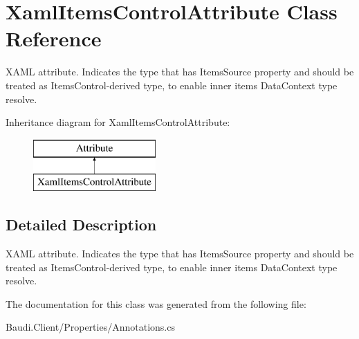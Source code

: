 \hypertarget{class_xaml_items_control_attribute}{}\section{Xaml\+Items\+Control\+Attribute Class Reference}
\label{class_xaml_items_control_attribute}


X\+A\+M\+L attribute. Indicates the type that has {\ttfamily Items\+Source} property and should be treated as {\ttfamily Items\+Control}-\/derived type, to enable inner items {\ttfamily Data\+Context} type resolve.  


Inheritance diagram for Xaml\+Items\+Control\+Attribute\+:\begin{figure}[H]
\begin{center}
\leavevmode
\includegraphics[height=2.000000cm]{class_xaml_items_control_attribute}
\end{center}
\end{figure}


\subsection{Detailed Description}
X\+A\+M\+L attribute. Indicates the type that has {\ttfamily Items\+Source} property and should be treated as {\ttfamily Items\+Control}-\/derived type, to enable inner items {\ttfamily Data\+Context} type resolve. 



The documentation for this class was generated from the following file\+:\begin{DoxyCompactItemize}
\item 
Baudi.\+Client/\+Properties/Annotations.\+cs\end{DoxyCompactItemize}
